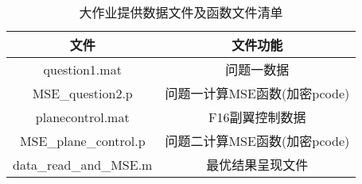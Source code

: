 \documentclass[10pt,twocolumn]{article}
\begin{document}
\begin{table}[!htbp]
\centering
\begin{tabular}{c|c}
\hline\hline
文件 & 文件功能 \\ \hline 
question1.mat & 问题一数据 \\
MSE\_question2.p & 问题一计算MSE函数(加密pcode) \\ \hline
planecontrol.mat & F16副翼控制数据 \\
MSE\_plane\_control.p & 问题二计算MSE函数(加密pcode) \\ \hline
data\_read\_and\_MSE.m & 最优结果呈现文件 \\ 
\hline\hline
\end{tabular}
\caption{大作业提供数据文件及函数文件清单}
\label{list2}
\end{table}
\end{document}
